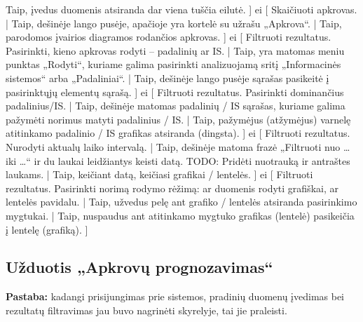 {    Taip, įvedus duomenis atsiranda dar viena tuščia eilutė.
    ]
  ei [
    Skaičiuoti apkrovas. |
    Taip, dešinėje lango pusėje, apačioje yra kortelė su užrašu
    „Apkrova“. |
    Taip, parodomos įvairios diagramos rodančios apkrovas.
    ]
  ei [
    Filtruoti rezultatus. Pasirinkti, kieno apkrovas rodyti –
    padalinių ar IS. |
    Taip, yra matomas meniu punktas „Rodyti“, kuriame galima pasirinkti
    analizuojamą sritį „Informacinės sistemos“ arba „Padaliniai“. |
    Taip, dešinėje lango pusėje sąrašas pasikeitė į pasirinktųjų elementų
    sąrašą.
    ]
  ei [
    Filtruoti rezultatus. Pasirinkti dominančius padalinius/IS. |
    Taip, dešinėje matomas padalinių / IS sąrašas, kuriame galima pažymėti
    norimus matyti padalinius / IS. |
    Taip, pažymėjus (atžymėjus) varnelę atitinkamo padalinio / IS 
    grafikas atsiranda (dingsta).
    ]
  ei [
    Filtruoti rezultatus. Nurodyti aktualų laiko intervalą. |
    Taip, dešinėje matoma frazė „Filtruoti nuo … iki …“ ir du laukai
    leidžiantys keisti datą.
    TODO: Pridėti nuotrauką ir antraštes laukams. |
    Taip, keičiant datą, keičiasi grafikai / lentelės.
    ]
  ei [
    Filtruoti rezultatus. Pasirinkti norimą rodymo rėžimą: ar
    duomenis rodyti grafiškai, ar lentelės pavidalu. |
    Taip, užvedus pelę ant grafiko / lentelės atsiranda pasirinkimo
    mygtukai. |
    Taip, nuspaudus ant atitinkamo mygtuko grafikas (lentelė) pasikeičia
    į lentelę (grafiką).
    ]
}

\subsection{Užduotis „Apkrovų prognozavimas“}

\textbf{Pastaba:} kadangi prisijungimas prie sistemos, pradinių
duomenų įvedimas bei rezultatų filtravimas jau buvo nagrinėti
 skyrelyje, tai jie praleisti.



